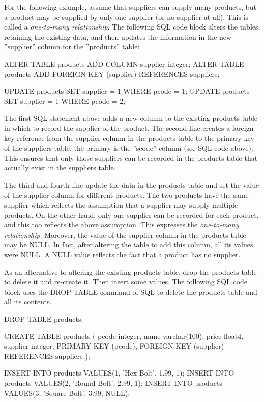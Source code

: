 For the following example, assume that suppliers can supply many products, but a product may be supplied by only one supplier (or no supplier at all). This is called a \emph{one-to-many relationship}. The following SQL code block alters the tables, retaining the existing data, and then updates the information in the new ''supplier'' column for the ''products'' table:

\begin{sqlcode}
ALTER TABLE products ADD COLUMN supplier integer;
ALTER TABLE products ADD FOREIGN KEY (supplier) REFERENCES suppliers;

UPDATE products SET supplier = 1 WHERE pcode = 1;
UPDATE products SET supplier = 1 WHERE pcode = 2;
\end{sqlcode}

The first SQL statement above adds a new column to the existing products table in which to record the supplier of the product. The second line creates a foreign key reference from the supplier column in the products table to the primary key of the suppliers table; the primary is the ''scode'' column (see SQL code above). This ensures that only those suppliers can be recorded in the products table that actually exist in the suppliers table. 

The third and fourth line update the data in the products table and set the value of the supplier column for different products. The two products have the same supplier which reflects the assumption that a supplier may supply multiple products. On the other hand, only one supplier can be recorded for each product, and this too reflects the above assumption. This expresses the \emph{one-to-many relationship}. Moreover, the value of the supplier column in the products table may be NULL. In fact, after altering the table to add this column, all its values were NULL. A NULL value reflects the fact that a product has no supplier.

As an alternative to altering the existing products table, drop the products table to delete it and re-create it. Then insert some values. The following SQL code block uses the DROP TABLE command of SQL to delete the products table and all its contents.

\begin{sqlcode}
DROP TABLE products;

CREATE TABLE products (
  pcode    integer,
  name     varchar(100),
  price    float4,
  supplier integer,
  PRIMARY KEY (pcode),
  FOREIGN KEY (supplier) REFERENCES suppliers 
);
  
INSERT INTO products VALUES(1, 'Hex Bolt', 1.99, 1);
INSERT INTO products VALUES(2, 'Round Bolt', 2.99, 1);
INSERT INTO products VALUES(3, 'Square Bolt', 3.99, NULL);
\end{sqlcode}

